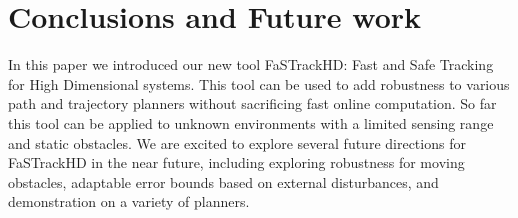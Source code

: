 \section{Conclusions and Future work}
In this paper we introduced our new tool FaSTrackHD: Fast and Safe Tracking for High Dimensional systems. This tool can be used to add robustness to various path and trajectory planners without sacrificing fast online computation. So far this tool can be applied to unknown environments with a limited sensing range and static obstacles. We are excited to explore several future directions for FaSTrackHD in the near future, including exploring robustness for moving obstacles, adaptable error bounds based on external disturbances, and demonstration on a variety of planners.